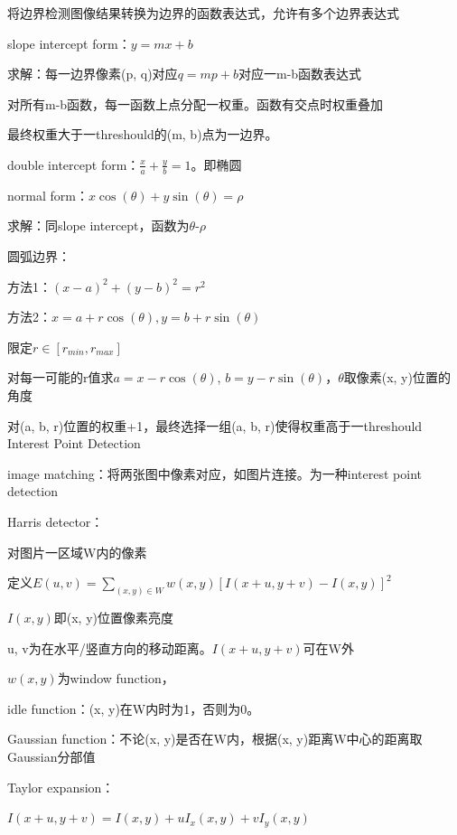 \documentclass[UTF8]{ctexart}
\begin{document}
  将边界检测图像结果转换为边界的函数表达式，允许有多个边界表达式

  \quad slope intercept form：$y = mx + b$

  \quad \quad 求解：每一边界像素(p, q)对应$q = mp + b$对应一m-b函数表达式

  \quad \quad \quad 对所有m-b函数，每一函数上点分配一权重。函数有交点时权重叠加
  
  \quad \quad \quad 最终权重大于一threshould的(m, b)点为一边界。

  \quad double intercept form：$\frac{x}{a} + \frac{y}{b} = 1$。即椭圆

  \quad normal form：$x\cos(\theta) + y\sin(\theta) = \rho$

  \quad \quad 求解：同slope intercept，函数为$\theta$-$\rho$

  \quad 圆弧边界：

  \quad \quad 方法1：$(x - a)^2 + (y - b)^2 = r^2$

  \quad \quad 方法2：$x = a + r\cos(\theta), y = b + r\sin(\theta)$
  
  \quad \quad \quad 限定$r \in [r_{min}, r_{max}]$

  \quad \quad \quad 对每一可能的r值求$a = x - r\cos(\theta)$, $b = y - r\sin(\theta)$，$\theta$取像素(x, y)位置的角度

  \quad \quad \quad 对(a, b, r)位置的权重+1，最终选择一组(a, b, r)使得权重高于一threshould\\
Interest Point Detection 

  image matching：将两张图中像素对应，如图片连接。为一种interest point detection 

  Harris detector：

  \quad 对图片一区域W内的像素

  \quad 定义$E(u, v) = \sum_{(x, y) \in W} w(x, y)[I(x + u, y + v) - I(x, y)]^2$

  \quad \quad $I(x, y)$即(x, y)位置像素亮度

  \quad \quad u, v为在水平/竖直方向的移动距离。$I(x + u, y + v)$可在W外

  \quad \quad $w(x, y)$为window function，
  
  \quad \quad \quad idle function：(x, y)在W内时为1，否则为0。
  
  \quad \quad \quad Gaussian function：不论(x, y)是否在W内，根据(x, y)距离W中心的距离取Gaussian分部值
  
  \quad Taylor expansion：

  \quad \quad $I(x + u, y + v) = I(x, y) + uI_x(x, y) + vI_y(x, y)$
\end{document}
